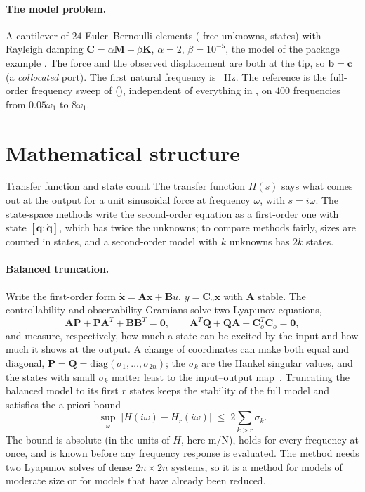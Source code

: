 \paragraph{The model problem.}
A cantilever of $24$ Euler--Bernoulli elements (\cbtNDof{} free unknowns, \cbtNState{} states) with Rayleigh damping $\bm C=\alpha\bm M+\beta\bm K$, $\alpha=2$, $\beta=10^{-5}$, the model of the package example . The force and the observed displacement are both at the tip, so $\bm b=\bm c$ (a \emph{collocated} port). The first natural frequency is \cbtFOne{}~Hz. The reference is the full-order frequency sweep of \fea{} (), independent of everything in \rom{}, on $400$ frequencies from $0.05\omega_1$ to $8\omega_1$.

\section{Mathematical structure}\label{sec:bt-math}

\begin{sidenote}{Transfer function and state count}
The transfer function $H(s)$ says what comes out at the output for a unit sinusoidal force at frequency $\omega$, with $s=i\omega$. The state-space methods write the second-order equation as a first-order one with state $[\bm q;\dot{\bm q}]$, which has twice the unknowns; to compare methods fairly, sizes are counted in states, and a second-order model with $k$ unknowns has $2k$ states.
\end{sidenote}

\paragraph{Balanced truncation.}
Write the first-order form $\dot{\bm x}=\bm A\bm x+\bm B u$, $y=\bm C_o\bm x$ with $\bm A$ stable. The controllability and observability Gramians solve two Lyapunov equations,
\begin{equation}\label{eq:bt-lyap}
\bm A\bm P+\bm P\bm A^T+\bm B\bm B^T=\bm 0,\qquad \bm A^T\bm Q+\bm Q\bm A+\bm C_o^T\bm C_o=\bm 0 ,
\end{equation}
and measure, respectively, how much a state can be excited by the input and how much it shows at the output. A change of coordinates can make both equal and diagonal, $\bm P=\bm Q=\mathrm{diag}(\sigma_1,\dots,\sigma_{2n})$; the $\sigma_k$ are the Hankel singular values, and the states with small $\sigma_k$ matter least to the input--output map~\cite{moore1981,antoulas2005}. Truncating the balanced model to its first $r$ states keeps the stability of the full model and satisfies the a priori bound~\cite{enns1984,glover1984}
\begin{equation}\label{eq:bt-bound}
\sup_{\omega}\;|H(i\omega)-H_r(i\omega)|\;\le\;2\sum_{k>r}\sigma_k .
\end{equation}
The bound is absolute (in the units of $H$, here m/N), holds for every frequency at once, and is known before any frequency response is evaluated. The method needs two Lyapunov solves of dense $2n\times2n$ systems, so it is a method for models of moderate size or for models that have already been reduced.

